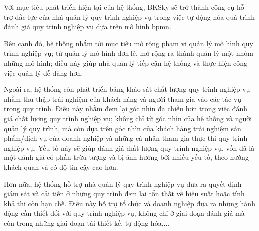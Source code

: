 
Với mục tiêu phát triển hiện tại của hệ thống, BKSky sẽ trở thành công cụ hỗ
trợ đắc lực của nhà quản lý quy trình nghiệp vụ trong việc tự động hóa quá
trình đánh giá quy trình nghiệp vụ dựa trên mô hình \acrfull*{bpmn}.

Bên cạnh đó, hệ thống nhắm tới mục tiêu mở rộng phạm vi quản lý mô hình quy
trình nghiệp vụ; từ quản lý mô hình đơn lẻ, mở rộng ra thành quản lý một nhóm
những mô hình; điều này giúp nhà quản lý tiếp cận hệ thống và thực hiện công
việc quản lý dễ dàng hơn.

Ngoài ra, hệ thống còn phát triển bảng khảo sát chất lượng quy trình nghiệp vụ
nhằm thu thập trải nghiệm của khách hàng và người tham gia vào các tác vụ trong
quy trình. Điều này nhằm đem lại góc nhìn đa chiều hơn trong việc đánh giá chất
lượng quy trình nghiệp vụ; không chỉ từ góc nhìn của hệ thống và người quản lý
quy trình, mà còn dựa trên góc nhìn của khách hàng trải nghiệm sản phẩm/dịch vụ
của doanh nghiệp và những cá nhân tham gia thực thi quy trình nghiệp vụ. Yếu tố
này sẽ giúp đánh giá chất lượng quy trình nghiệp vụ, vốn đã là một đánh giá có
phần trừu tượng và bị ảnh hưởng bởi nhiều yếu tố, theo hướng khách quan và có
độ tin cậy cao hơn.

Hơn nữa, hệ thống hỗ trợ nhà quản lý quy trình nghiệp vụ đưa ra quyết định giám
sát và cải tiến ở những quy trình đem lại tổn thất về hiệu suất hoặc tính khả
thi còn hạn chế. Điều này hỗ trợ tổ chức và doanh nghiệp đưa ra những hành động
cần thiết đối với quy trình nghiệp vụ, không chỉ ở giai đoạn đánh giá mà còn
trong những giai đoạn tái thiết kế, tự động hóa,...